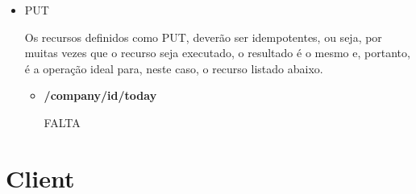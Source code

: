 \documentclass[a4paper,12pt]{article}
\begin{document}
\begin{itemize}
\begin{itemize}
    
  \end{itemize}
\item PUT
  \par Os recursos definidos como PUT, deverão ser idempotentes, ou seja, por muitas vezes que o recurso seja executado, o resultado é o mesmo e, portanto, é a operação ideal para, neste caso, o recurso listado abaixo.
  \begin{itemize}
    \item \textbf{/company/{id}/today}

    \par FALTA
  \end{itemize}
\end{itemize}

\section{Client}
\end{document}
